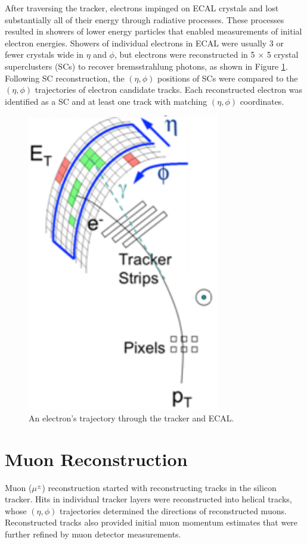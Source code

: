 After traversing the tracker, electrons impinged on ECAL crystals and lost substantially all of their 
energy through radiative processes.  These processes resulted in showers of lower energy particles 
that enabled measurements of initial electron energies.  Showers of individual electrons in ECAL were usually 
3 or fewer crystals wide in $\eta$ and $\phi$, but electrons were reconstructed in 5 $\times$ 5 crystal 
superclusters (SCs) to recover bremsstrahlung photons, as shown in Figure \ref{fig:eleTrackAndSC}.  Following 
SC reconstruction, the $(\eta, \phi)$ positions of SCs were compared to 
the $(\eta, \phi)$ trajectories of electron candidate tracks.  Each reconstructed electron was identified 
as a SC and at least one track with matching $(\eta, \phi)$ coordinates.

\begin{figure}[h]
	\centering
	\includegraphics[width=0.75\textwidth]{figures/electronTrackAndSupercluster.png}
	\caption{An electron's trajectory through the tracker and ECAL.}
	\label{fig:eleTrackAndSC}
\end{figure}


\section{Muon Reconstruction}
\label{sec:muReco}
Muon ($\mu^{\pm}$) reconstruction started with reconstructing tracks in the silicon tracker.  
Hits in individual tracker layers were reconstructed into helical tracks, whose $(\eta, \phi)$ 
trajectories determined the directions of reconstructed muons.  Reconstructed tracks also provided 
initial muon momentum estimates that were further refined by muon detector measurements.

